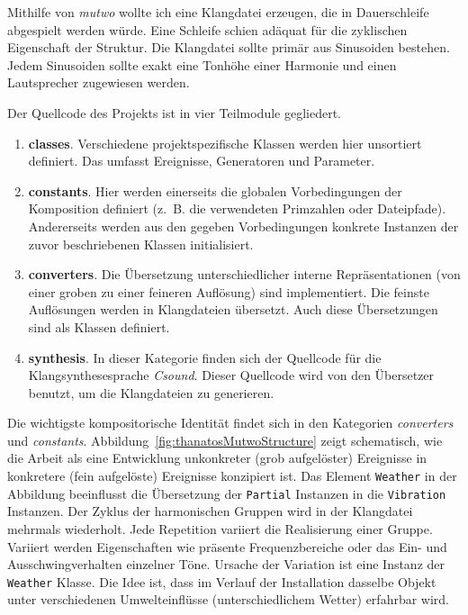 \documentclass[12pt,a4paper,ngerman]{article}
\begin{document}
Mithilfe von \emph{mutwo} wollte ich eine Klangdatei erzeugen, die in Dauerschleife abgespielt werden würde.
Eine Schleife schien adäquat für die zyklischen Eigenschaft der Struktur.
Die Klangdatei sollte primär aus Sinusoiden bestehen.
Jedem Sinusoiden sollte exakt eine Tonhöhe einer Harmonie und einen Lautsprecher zugewiesen werden.

\smallskip

Der Quellcode des Projekts ist in vier Teilmodule gegliedert.

\begin{enumerate}
    \item{%
        \textbf{classes}.
        Verschiedene projektspezifische Klassen werden hier unsortiert definiert.
        Das umfasst Ereignisse, Generatoren und Parameter.
    }

    \item{%
        \textbf{constants}.
        Hier werden einerseits die globalen Vorbedingungen der Komposition definiert (z.~B. die verwendeten Primzahlen oder Dateipfade).
        Andererseits werden aus den gegeben Vorbedingungen konkrete Instanzen der zuvor beschriebenen Klassen initialisiert.
    }

    \item{%
        \textbf{converters}.
        Die Übersetzung unterschiedlicher interne Repräsentationen (von einer groben zu einer feineren Auflösung) sind implementiert.
        Die feinste Auflösungen werden in Klangdateien übersetzt.
        Auch diese Übersetzungen sind als Klassen definiert.
    }

    \item{%
        \textbf{synthesis}.
        In dieser Kategorie finden sich der Quellcode für die Klangsynthesesprache \emph{Csound}.
        Dieser Quellcode wird von den Übersetzer benutzt, um die Klangdateien zu generieren.
    }
\end{enumerate}

Die wichtigste kompositorische Identität findet sich in den Kategorien \emph{converters} und \emph{constants}.
Abbildung~\ref{fig:thanatosMutwoStructure} zeigt schematisch, wie die Arbeit als eine Entwicklung unkonkreter (grob aufgelöster) Ereignisse in konkretere (fein aufgelöste) Ereignisse konzipiert ist.
Das Element \texttt{Weather} in der Abbildung beeinflusst die Übersetzung der \texttt{Partial} Instanzen in die \texttt{Vibration} Instanzen.
Der Zyklus der harmonischen Gruppen wird in der Klangdatei mehrmals wiederholt.
Jede Repetition variiert die Realisierung einer Gruppe.
Variiert werden Eigenschaften wie präsente Frequenzbereiche oder das Ein- und Ausschwingverhalten einzelner Töne.
Ursache der Variation ist eine Instanz der \texttt{Weather} Klasse.
Die Idee ist, dass im Verlauf der Installation dasselbe Objekt unter verschiedenen Umwelteinflüsse (unterschiedlichem Wetter) erfahrbar wird.
\end{document}
